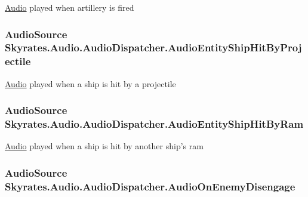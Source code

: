 \hyperlink{namespace_skyrates_1_1_audio}{Audio} played when artillery is fired 

\hypertarget{class_skyrates_1_1_audio_1_1_audio_dispatcher_ac1ed48f44711cc8117e0d4246c4c395f}{
\subsubsection[{Audio\-Entity\-Ship\-Hit\-By\-Projectile}]{\setlength{\rightskip}{0pt plus 5cm}Audio\-Source Skyrates.\-Audio.\-Audio\-Dispatcher.\-Audio\-Entity\-Ship\-Hit\-By\-Projectile}}\label{class_skyrates_1_1_audio_1_1_audio_dispatcher_ac1ed48f44711cc8117e0d4246c4c395f}


\hyperlink{namespace_skyrates_1_1_audio}{Audio} played when a ship is hit by a projectile 

\hypertarget{class_skyrates_1_1_audio_1_1_audio_dispatcher_a78f27d7e62592efb1f09fb343148c0e9}{
\subsubsection[{Audio\-Entity\-Ship\-Hit\-By\-Ram}]{\setlength{\rightskip}{0pt plus 5cm}Audio\-Source Skyrates.\-Audio.\-Audio\-Dispatcher.\-Audio\-Entity\-Ship\-Hit\-By\-Ram}}\label{class_skyrates_1_1_audio_1_1_audio_dispatcher_a78f27d7e62592efb1f09fb343148c0e9}


\hyperlink{namespace_skyrates_1_1_audio}{Audio} played when a ship is hit by another ship's ram 

\hypertarget{class_skyrates_1_1_audio_1_1_audio_dispatcher_a23c0754205f0048d214a2e9f4f2e1bbb}{
\subsubsection[{Audio\-On\-Enemy\-Disengage}]{\setlength{\rightskip}{0pt plus 5cm}Audio\-Source Skyrates.\-Audio.\-Audio\-Dispatcher.\-Audio\-On\-Enemy\-Disengage}}\label{class_skyrates_1_1_audio_1_1_audio_dispatcher_a23c0754205f0048d214a2e9f4f2e1bbb}


